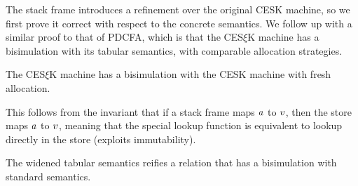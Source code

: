 The stack frame introduces a refinement over the original CESK machine, so we first prove it correct with respect to the concrete semantics.
%
We follow up with a similar proof to that of PDCFA, which is that the CES$\xi$K machine has a bisimulation with its tabular semantics, with comparable allocation strategies.
\begin{theorem}\label{thm:refinement}
  The CES$\xi$K machine has a bisimulation with the CESK machine with fresh allocation.
\end{theorem}
This follows from the invariant that if a stack frame maps $a$ to $v$, then the store maps $a$ to $v$, meaning that the special lookup function is equivalent to lookup directly in the store (exploits immutability).
%
%
%
%
%

\begin{theorem}\label{thm:cfa2}
  The widened tabular semantics reifies a relation that has a bisimulation with standard semantics.
\end{theorem}

